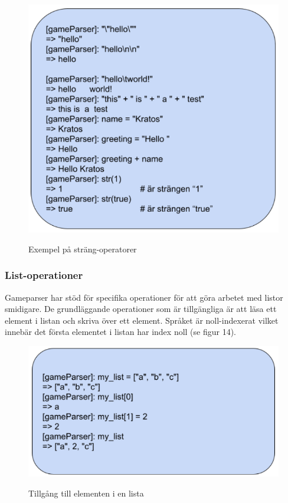 \documentclass{Dokumentmall}
\begin{document}
\begin{figure}[h!]
  \centering
  \includegraphics[scale = 0.65]{Images/Figur13.png}
  \label{}
  \caption{Exempel på sträng-operatorer}
\end{figure}


\subsubsection{List-operationer}
Gameparser har stöd för specifika operationer för att göra arbetet med listor smidigare. De grundläggande operationer som är tillgängliga är att läsa ett element i listan och skriva över ett element. Språket är noll-indexerat vilket innebär det första elementet i listan har index noll (se figur 14).

\begin{figure}[h!]
  \centering
  \includegraphics[scale = 0.65]{Images/Figur14.png}
  \label{}
  \caption{Tillgång till elementen i en lista}
\end{figure}
\end{document}
